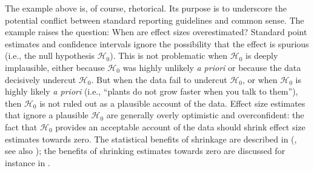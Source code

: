 \documentclass[a4paper]{article}
\newcommand{\EJ}[1]{\todo[inline, color=green]{  #1 }}
\newcommand{\DON}[1]{\todo[inline, color=white]{Don: #1}}
\newenvironment{revision}{\color{teal}}{\color{black}}
\begin{document}
\begin{revision}%
The example above is, of course, rhetorical.
Its purpose is to underscore the potential conflict between standard reporting guidelines and common sense.
The example raises the question: When are effect sizes overestimated?
\end{revision}%
Standard point estimates and confidence intervals ignore the possibility that the effect is spurious (i.e., the null hypothesis $\mathcal{H}_0$). This is not problematic when $\mathcal{H}_0$ is deeply implausible, either because $\mathcal{H}_0$ was highly unlikely \emph{a priori} or because the data decisively undercut $\mathcal{H}_0$. But when the data fail to undercut $\mathcal{H}_0$, or when $\mathcal{H}_0$ is highly likely \emph{a priori} (i.e., ``plants do not grow faster when you talk to them''), then $\mathcal{H}_0$ is not ruled out as a plausible account of the data. Effect size estimates that ignore a plausible $\mathcal{H}_0$ are generally \begin{revision}overly optimistic and\end{revision} overconfident: the fact that $\mathcal{H}_0$ provides an acceptable account of the data should shrink effect size estimates towards zero.
\begin{revision}%
The statistical benefits of shrinkage are described in \citeauthor{EfronMorris1977} (\citeyear{EfronMorris1977}, see also \cite{davis2018estimation, RouderLu2005, ShiffrinEtAl2008}); the benefits of shrinking estimates towards zero are discussed for instance in \textcite{IversonEtAl2010, vanErp2019shrinkage, george1993variable}.
\end{revision}
\end{document}
